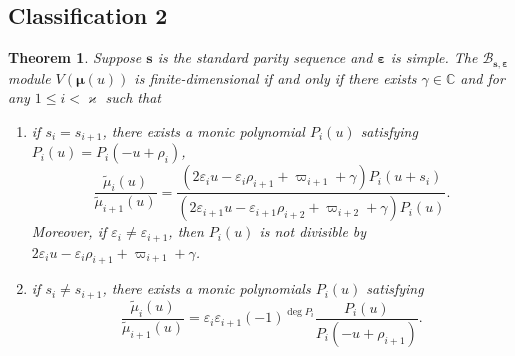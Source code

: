 \documentclass[11pt,reqno]{amsart}
\numberwithin{equation}{section}
\newtheorem{thm}{Theorem}[section]
\theoremstyle{definition}
\theoremstyle{remark}
\newcommand{\beq}{\begin{equation}}
\newcommand{\eeq}{\end{equation}}
\newcommand{\C}{\mathbb{C}}
\newcommand{\tl}{\tilde}
\newcommand{\lle}{\leqslant}
\newcommand{\BMN}{{\mathscr{B}_{\bm s,\bm \ve}}}
\newcommand{\ka}{\varkappa}
\newcommand{\ve}{\varepsilon}
\newcommand{\s}{{\bm s}}
\begin{document}
\subsection{Classification 2}
\begin{thm}\label{thm:main-super-class}
Suppose  $\s$ is the standard parity sequence and $\bm\ve$ is simple. The $\BMN$ module $V(\bm\mu(u))$ is finite-dimensional if and only if there exists $\gamma\in\C$ and for any $1\lle i<\ka$ such that
\begin{enumerate}
    \item if $s_i=s_{i+1}$, there exists a monic polynomial $P_i(u)$ satisfying $P_i(u)=P_i(-u+\rho_i)$,
\beq\label{eq:gamma-thm}
\frac{\tl \mu_i(u)}{\tl \mu_{i+1}(u)}=\frac{(2\ve_i u-\ve_i\rho_{i+1}+\varpi_{i+1}+\gamma)P_i(u+s_i)}{(2\ve_{i+1} u-\ve_{i+1}\rho_{i+2}+\varpi_{i+2}+\gamma)P_i(u)}.
\eeq
Moreover, if $\ve_i\ne\ve_{i+1}$, then $P_i(u)$ is not divisible by $2\ve_i u-\ve_i\rho_{i+1}+\varpi_{i+1}+\gamma$.
\item if $s_i\ne s_{i+1}$, there exists a monic polynomials $P_i(u)$ satisfying
\[
\frac{\tl \mu_i(u)}{\tl \mu_{i+1}(u)}=\ve_i\ve_{i+1}(-1)^{\deg P_i}\frac{P_i(u)}{P_{i}(-u+\rho_{i+1})}.
\]
\end{enumerate}
\end{thm}
\end{document}
